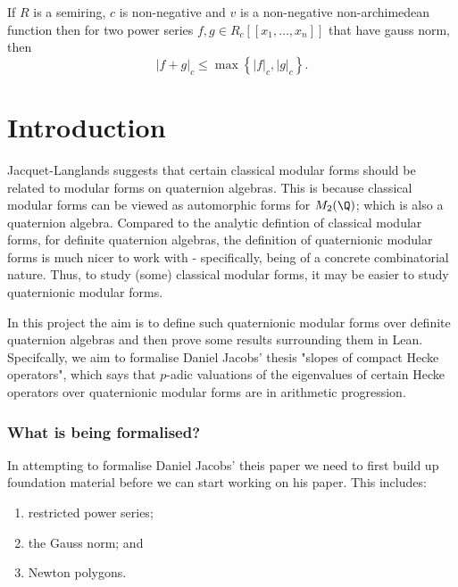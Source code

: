 \begin{lemma}
  If $R$ is a semiring, $c$ is non-negative and $v$ is a non-negative non-archimedean function then
  for two power series $f, g \in R_c [ \! [ x_1, \dots, x_n ] \! ]$ that have gauss norm, then
  \[
    \lvert f + g \rvert_c \leq \max \left\{ \lvert f \rvert_c, \lvert g \rvert_c \right\}.
  \]
\end{lemma}



\chapter{Introduction}

Jacquet-Langlands suggests that certain classical modular forms should be related to modular forms
on quaternion algebras. This is because classical modular forms can be viewed as automorphic forms
for $M_2 (\Q)$; which is also a quaternion algebra. Compared to the analytic defintion of classical
modular forms, for definite quaternion algebras, the definition of quaternionic modular forms is
much nicer to work with - specifically, being of a concrete combinatorial nature. Thus, to study
(some) classical modular forms, it may be easier to study quaternionic modular forms.

In this project the aim is to define such quaternionic modular forms over definite quaternion
algebras and then prove some results surrounding them in Lean. Specifcally, we aim to formalise
Daniel Jacobs' thesis "slopes of compact Hecke operators", which says that $p$-adic valuations of the
eigenvalues of certain Hecke operators over quaternionic modular forms are in arithmetic
progression.

\subsection{What is being formalised?}

In attempting to formalise Daniel Jacobs' theis paper we need to first build up foundation material
before we can start working on his paper. This includes:

\begin{enumerate}
  \item restricted power series;
  \item the Gauss norm; and
  \item Newton polygons.
\end{enumerate}

